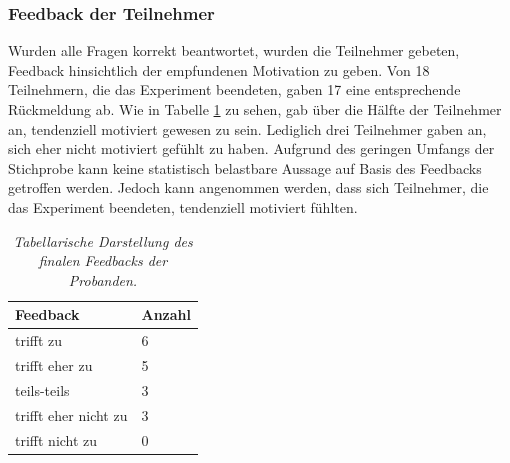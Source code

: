 \subsubsection{Feedback der Teilnehmer}
Wurden alle Fragen korrekt beantwortet, wurden die Teilnehmer gebeten, Feedback hinsichtlich der empfundenen Motivation zu geben. Von 18 Teilnehmern, die das Experiment beendeten, gaben 17 eine entsprechende Rückmeldung ab. Wie in Tabelle \ref{feedback} zu sehen, gab über die Hälfte der Teilnehmer an, tendenziell motiviert gewesen zu sein. Lediglich drei Teilnehmer gaben an, sich eher nicht motiviert gefühlt zu haben. Aufgrund des geringen Umfangs der Stichprobe kann keine statistisch belastbare Aussage auf Basis des Feedbacks getroffen werden. Jedoch kann angenommen werden, dass sich Teilnehmer, die das Experiment beendeten, tendenziell motiviert fühlten.

\begin{table}[htbp]
\centering
\caption{\textit{Tabellarische Darstellung des finalen Feedbacks der Probanden.}}
\begin{tabular}{ p{4cm}   p{2cm}}
 \hline
 Feedback & Anzahl \\
 \hline
 trifft zu & 6 \\
 trifft eher zu & 5 \\
 teils-teils & 3 \\
 trifft eher nicht zu & 3 \\
 trifft nicht zu & 0 \\
 \hline
\end{tabular}
\label{feedback}
\end{table}